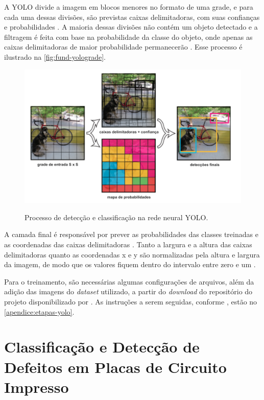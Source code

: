 A YOLO divide a imagem em blocos menores no formato de uma grade, e para cada uma dessas divisões, são previstas caixas delimitadoras, com suas confianças e probabilidades \cite{ref:Redmon-et-al}. A maioria dessas divisões não contém um objeto detectado e a filtragem é feita com base na probabilidade da classe do objeto, onde apenas as caixas delimitadoras de maior probabilidade permanecerão \cite{ref:Sivarajkumar}. Esse processo é ilustrado na \autoref{fig:fund-yolograde}.

\begin{figure}[h!] %
  \centering
  \caption{Processo de detecção e classificação na rede neural YOLO.}
  \includegraphics[scale=0.95]{img/img-fundamentacao-yolograde.pdf}
  \label{fig:fund-yolograde}
\end{figure}

A camada final é responsável por prever as probabilidades das classes treinadas e as coordenadas das caixas delimitadoras \cite{ref:Redmon-et-al}. Tanto a largura e a altura das caixas delimitadoras quanto as coordenadas x e y são normalizadas pela altura e largura da imagem, de modo que os valores fiquem dentro do intervalo entre zero e um \cite{ref:Redmon-et-al}.

Para o treinamento, são necessárias algumas configurações de arquivos, além da adição das imagens do \textit{dataset} utilizado, a partir do \textit{download} do repositório do projeto disponibilizado por . As instruções a serem seguidas, conforme , estão no \autoref{apendice:etapas-yolo}.

\section{Classificação e Detecção de Defeitos em Placas de Circuito Impresso} \label{cap:fund-pcb}

